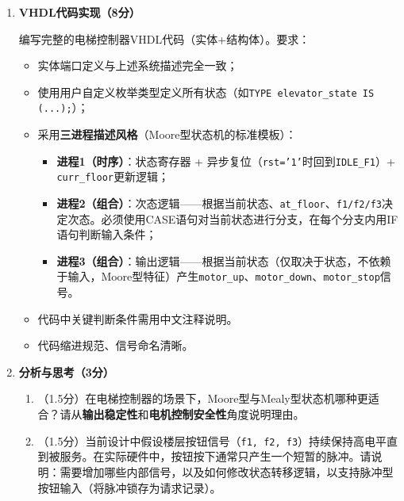 \begin{enumerate}[label=(\arabic*)]
  至少覆盖12行（覆盖各状态的主要转移情况）。

  \item \textbf{VHDL代码实现（8分）}

  编写完整的电梯控制器VHDL代码（实体+结构体）。要求：
  \begin{itemize}
    \item 实体端口定义与上述系统描述完全一致；
    \item 使用用户自定义枚举类型定义所有状态（如\texttt{TYPE elevator\_state IS (...);}）；
    \item 采用\textbf{三进程描述风格}（Moore型状态机的标准模板）：
    \begin{itemize}
      \item \textbf{进程1（时序）}：状态寄存器 + 异步复位（\texttt{rst='1'}时回到\texttt{IDLE\_F1}）+ \texttt{curr\_floor}更新逻辑；
      \item \textbf{进程2（组合）}：次态逻辑——根据当前状态、\texttt{at\_floor}、\texttt{f1/f2/f3}决定次态。必须使用CASE语句对当前状态进行分支，在每个分支内用IF语句判断输入条件；
      \item \textbf{进程3（组合）}：输出逻辑——根据当前状态（仅取决于状态，不依赖于输入，Moore型特征）产生\texttt{motor\_up}、\texttt{motor\_down}、\texttt{motor\_stop}信号。
    \end{itemize}
    \item 代码中关键判断条件需用中文注释说明。
    \item 代码缩进规范、信号命名清晰。
  \end{itemize}

  \item \textbf{分析与思考（3分）}
  \begin{enumerate}
    \item （1.5分）在电梯控制器的场景下，Moore型与Mealy型状态机哪种更适合？请从\textbf{输出稳定性}和\textbf{电机控制安全性}角度说明理由。
    \item （1.5分）当前设计中假设楼层按钮信号（\texttt{f1, f2, f3}）持续保持高电平直到被服务。在实际硬件中，按钮按下通常只产生一个短暂的脉冲。请说明：需要增加哪些内部信号，以及如何修改状态转移逻辑，以支持脉冲型按钮输入（将脉冲锁存为请求记录）。
  \end{enumerate}
\end{enumerate}

